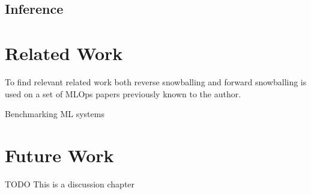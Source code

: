 \subsection{Inference}


\section{Related Work}

To find relevant related work both reverse snowballing and forward snowballing is used on a set of MLOps papers previously known to the author.

Benchmarking ML systems \parencite{cardososilvaBenchmarkingMachineLearning2020}

\section{Future Work}
TODO This is a discussion chapter